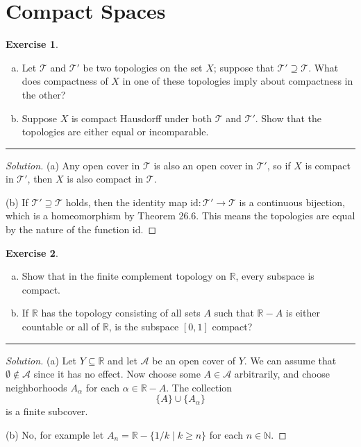 \documentclass{article}
\theoremstyle{definition}
\newtheorem{exercise}{Exercise}[section]
\begin{document}
\addtocounter{section}{25}
\section{Compact Spaces}

\begin{exercise}
  \begin{enumerate}[(a)]
    \item Let $\mathcal{T}$ and $\mathcal{T}'$ be two topologies on the set $X$; suppose that $\mathcal{T}'\supseteq\mathcal{T}$. What does compactness of $X$ in one of these topologies imply about compactness in the other?
    \item Suppose $X$ is compact Hausdorff under both $\mathcal{T}$ and $\mathcal{T}'$. Show that the topologies are either equal or incomparable.
  \end{enumerate}
\end{exercise}
\hrule
\begin{proof}[Solution]
  (a) Any open cover in $\mathcal{T}$ is also an open cover in $\mathcal{T}'$, so if $X$ is compact in $\mathcal{T}'$, then $X$ is also compact in $\mathcal{T}$.

  (b) If $\mathcal{T}'\supseteq\mathcal{T}$ holds, then the identity map $\mathrm{id}:\mathcal{T}'\to\mathcal{T}$ is a continuous bijection, which is a homeomorphism by Theorem 26.6. This means the topologies are equal by the nature of the function $\mathrm{id}$.
\end{proof}

\pagebreak

\begin{exercise}
  \begin{enumerate}[(a)]
    \item Show that in the finite complement topology on $\mathbb{R}$, every subspace is compact.
    \item If $\mathbb{R}$ has the topology consisting of all sets $A$ such that $\mathbb{R}-A$ is either countable or all of $\mathbb{R}$, is the subspace $[0,1]$ compact?
  \end{enumerate}
\end{exercise}
\hrule
\begin{proof}[Solution]
  (a) Let $Y\subseteq\mathbb{R}$ and let $\mathcal{A}$ be an open cover of $Y$. We can assume that $\emptyset\notin\mathcal{A}$ since it has no effect. Now choose some $A\in\mathcal{A}$ arbitrarily, and choose neighborhoods $A_\alpha$ for each $\alpha\in \mathbb{R}-A$. The collection
  $$\{A\}\cup\{A_\alpha\}$$
  is a finite subcover.

  (b) No, for example let $A_n = \mathbb{R} - \{1/k\mid k\ge n\}$ for each $n\in\mathbb{N}$.
\end{proof}
\end{document}
